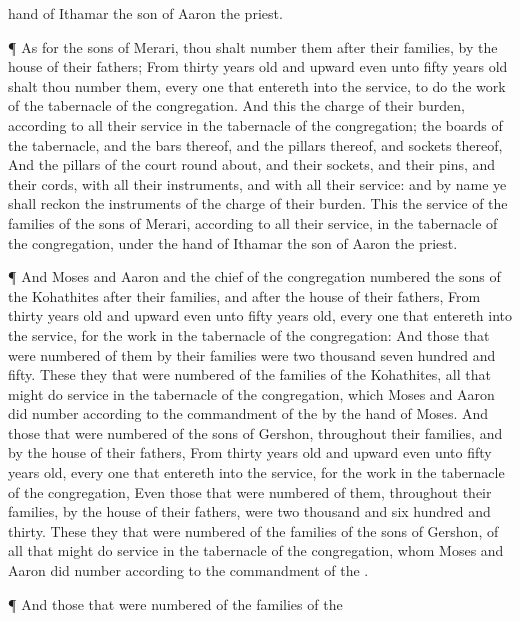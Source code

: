 {hand of
Ithamar the
son of
Aaron the
priest.
\par }{\PP {}¶ As for the
sons of
Merari, thou shalt
number them after their
families, by the
house of their
fathers;
From
thirty
years
old and
upward even unto
fifty
years
old shalt thou
number them, every one that
entereth into the
service, to
do the
work of the
tabernacle of the
congregation.
And this
{} the
charge of their
burden, according to all their
service in the
tabernacle of the
congregation; the
boards of the
tabernacle, and the
bars thereof, and the
pillars thereof, and
sockets thereof,
And the
pillars of the
court round
about, and their
sockets, and their
pins, and their
cords, with all their
instruments, and with all their
service: and by
name ye shall
reckon the
instruments of the
charge of their
burden.
This
{} the
service of the
families of the
sons of
Merari, according to all their
service, in the
tabernacle of the
congregation, under the
hand of
Ithamar the
son of
Aaron the
priest.
\par }{\PP {}¶ And
Moses and
Aaron and the
chief of the
congregation
numbered the
sons of the
Kohathites after their
families, and after the
house of their
fathers,
From
thirty
years
old and
upward even unto
fifty
years
old, every one that
entereth into the
service, for the
work in the
tabernacle of the
congregation:
And those that were
numbered of them by their
families were two
thousand
seven
hundred and
fifty.
These
{} they that were
numbered of the
families of the
Kohathites, all that might do
service in the
tabernacle of the
congregation, which
Moses and
Aaron did
number according to the
commandment of the
{} by the
hand of
Moses.
And those that were
numbered of the
sons of
Gershon, throughout their
families, and by the
house of their
fathers,
From
thirty
years
old and
upward even unto
fifty
years
old, every one that
entereth into the
service, for the
work in the
tabernacle of the
congregation,
Even those that were
numbered of them, throughout their
families, by the
house of their
fathers, were two
thousand and
six
hundred and
thirty.
These
{} they that were
numbered of the
families of the
sons of
Gershon, of all that might do
service in the
tabernacle of the
congregation, whom
Moses and
Aaron did
number according to the
commandment of the
{}.
\par }{\PP {}¶ And those that were
numbered of the
families of the
}

